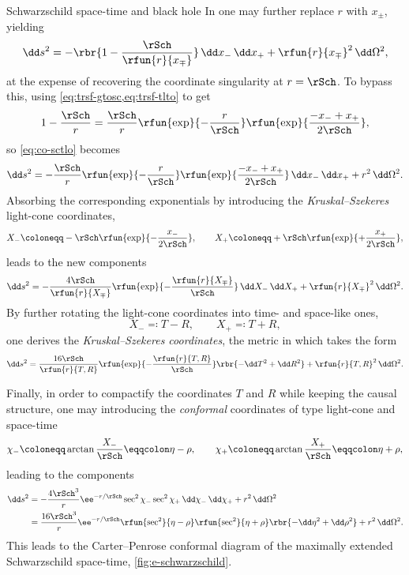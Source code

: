 \begin{nameddef}{Schwarzschild space-time and black hole}
In  one may further replace $r$ 
with $x_\pm$, yielding
\begin{equation}
\dd s^2 = -\rbr{1-\frac{\rSch}{\rfun{r}{x_\mp}}}\,\dd x_-\,\dd x_+
+\rfun{r}{x_\mp}^2\,\dd\Omega^2,
\label{eq:co-sctlo}
\end{equation}
at the expense of recovering the coordinate singularity at $r = \rSch$. To 
bypass this, using
\cref{eq:trsf-gtosc,eq:trsf-tlto} to get
\begin{equation}
1-\frac{\rSch}{r} = \frac{\rSch}{r}\rfun{\exp}{-\frac{r}{\rSch}}
\rfun{\exp}{\frac{-x_-+x_+}{2\rSch}},
\end{equation}
so \cref{eq:co-sctlo} becomes
\begin{equation}
\dd s^2 = -\frac{\rSch}{r}\rfun{\exp}{-\frac{r}{\rSch}}
\rfun{\exp}{\frac{-x_-+x_+}{2\rSch}}\,\dd x_-\,\dd x_+
+ r^2\,\dd\Omega^2.
\end{equation}
Absorbing the corresponding exponentials by introducing the
\emph{Kruskal--Szekeres} light-cone coordinates,
\begin{equation}
X_- \coloneqq -\rSch \rfun{\exp}{-\frac{x_-}{2\rSch}},
\qquad
X_+ \coloneqq +\rSch \rfun{\exp}{+\frac{x_+}{2\rSch}},
\end{equation}
leads to the new components
\begin{equation}
\dd s^2 = 
-\frac{4\rSch}{\rfun{r}{X_\mp}}\rfun{\exp}{-\frac{\rfun{r}{X_\mp}}{\rSch}}
\,\dd X_-\,\dd X_+ + \rfun{r}{X_\mp}^2\,\dd\Omega^2.
\end{equation}
By further rotating the light-cone coordinates into time- and space-like ones,
\begin{equation}
X_- \eqqcolon T-R,\qquad X_+ \eqqcolon T+R,
\end{equation}
one derives the \emph{Kruskal--Szekeres coordinates}, the metric in which takes 
the form
\begin{equation}
\dd s^2 = 
\frac{16\rSch}{\rfun{r}{T,R}}\rfun{\exp}{-\frac{\rfun{r}{T,R}}{\rSch}}
\rbr{-\dd T^2 + \dd R^2} + \rfun{r}{T,R}^2\,\dd\Omega^2.
\end{equation}

Finally, in order to compactify the coordinates $T$ and $R$ while keeping the 
causal structure, one may introducing the \emph{conformal} coordinates of type 
light-cone and space-time
\begin{equation}
\chi_- \coloneqq \arctan\frac{X_-}{\rSch} \eqqcolon \eta - \rho, \qquad
\chi_+ \coloneqq \arctan\frac{X_+}{\rSch} \eqqcolon \eta + \rho,
\end{equation}
leading to the components
\begin{align}
\dd s^2
&= -\frac{4\rSch^3}{r}\ee^{-r/\rSch}\sec^2\chi_-\sec^2\chi_+ 
\,\dd\chi_-\,\dd\chi_+ + r^2\,\dd\Omega^2 \\
&= \frac{16\rSch^3}{r}\ee^{-r/\rSch}
\rfun{\sec^2}{\eta-\rho}\rfun{\sec^2}{\eta+\rho}
\rbr{-\dd\eta^2+\dd\rho^2} + r^2\,\dd\Omega^2.
\end{align}
This leads to the Carter--Penrose conformal diagram of the maximally extended
Schwarzschild space-time, \cref{fig:e-schwarzschild}.


\end{nameddef}
